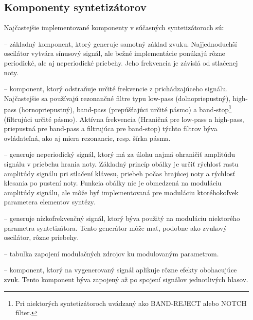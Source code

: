 \subsection{Komponenty syntetizátorov}
Najčastejšie implementované komponenty v súčasných syntetizátoroch sú:
\begin{description}
\setlength{\itemsep}{-0.5ex}

\item[Oscilátor] -- základný komponent, ktorý generuje samotný základ zvuku. Najjednoduchší oscilátor vytvára sínusový signál, ale bežné implementácie ponúkajú rôzne periodické, ale aj neperiodické priebehy. Jeho frekvencia je závislá od stlačenej noty.
\item[Filter] -- komponent, ktorý odstraňuje určité frekvencie z prichádzajúceho signálu. Najčastejšie sa používajú rezonančné filtre typu low-pass (dolnopriepustný), high-pass (hornopriepustný), band-pass (prepúšťajúci určité pásmo) a band-stop\footnote{Pri niektorých syntetizátoroch uvádzaný ako BAND-REJECT alebo NOTCH filter.} (filtrujúci určité pásmo). Aktívna frekvencia (Hraničná pre low-pass a high-pass, priepustná pre band-pass a filtrujúca pre band-stop) týchto filtrov býva ovládateľná, ako aj miera rezonancie, resp. šírka pásma.
\item[Generátor obálky] -- generuje neperiodický signál, ktorý má za úlohu najmä ohraničiť amplitúdu signálu v priebehu hrania noty. Základný princíp obálky je určiť rýchlosť rastu amplitúdy signálu pri stlačení klávesu, priebeh počas hrajúcej noty a rýchlosť klesania po pustení noty. Funkcia obálky nie je obmedzená na moduláciu amplitúdy signálu, ale môže byť implementovaná pre moduláciu ktoréhokoľvek parametera elementov syntézy.
\item[Nízkofrekvenčný oscilátor (LFO)] -- generuje nízkofrekvenčný   signál, ktorý býva použitý na moduláciu niektorého parametra syntetizátora. Tento generátor môže mať, podobne ako zvukový oscilátor, rôzne priebehy.
\item[Modulačná matica (Modulation Matrix)] -- tabuľka zapojení modulačných zdrojov ku modulovaným parametrom.
\item[Efektová jednotka] -- komponent, ktorý na vygenerovaný signál aplikuje rôzne efekty obohacujúce zvuk. Tento komponent býva zapojený až po spojení signálov jednotlivých hlasov.



\end{description}



